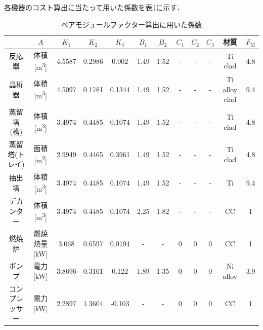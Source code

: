 \documentclass[a4j]{jsreport}
\begin{document}
各機器のコスト算出に当たって用いた係数を表\ref{BM係数}に示す．
\begin{table}[htbp]
    \caption{ベアモジュールファクター算出に用いた係数}
    \label{BM係数}
    \begin{tabular}{cccccccccccc}\hline
    &$A$ & $K_1$     & $K_2$     & $K_3$     & $B_1$   & $B_2$   &$C_1$&$C_2$&$C_3$& 材質 & $F_\mathrm{M}$  \\\hline
    反応器  & 体積[\si{\cubic\metre}]  & 4.5587 & 0.2986 & 0.002  & 1.49 & 1.52 &-&-&-& Ti clad       & 4.8 \\
    晶析器   & 体積[\si{\cubic\metre}] & 4.5097 & 0.1781 & 0.1344 & 1.49 & 1.52 &-&-&-& Ti alloy clad & 9.4 \\
    蒸留塔(槽)&  体積[\si{\cubic\metre}]   & 3.4974 & 0.4485 & 0.1074 & 1.49 & 1.52 &-&-&-& Ti clad    & 4.8 \\
    蒸留塔(トレイ)& 面積[\si{\square\metre}] & 2.9949 & 0.4465 & 0.3961 & 1.49 & 1.52 &-&-&-& Ti clad   & 4.8 \\
    抽出塔   & 体積[\si{\cubic\metre}] & 3.4974 & 0.4485 & 0.1074 & 1.49 & 1.52 &-&-&-& Ti            & 9.4 \\
    デカンター&  体積[\si{\cubic\metre}] & 3.4974 & 0.4485 & 0.1074 & 2.25 & 1.82 &-&-&-& CC            & 1   \\
    燃焼炉   & 燃焼熱量[\si{\kilo \watt}] & 3.068  & 0.6597 & 0.0194 & -    & -    &0&0&0& CC             & 1   \\
    ポンプ   & 電力[\si{\kilo\watt}] & 3.8696 & 0.3161 & 0.122  & 1.89 & 1.35 &0&0&0& Ni alloy      & 3.9 \\
    コンプレッサー& 電力[\si{\kilo\watt}] & 2.2897 & 1.3604 & -0.103 & -    & -    &0&0&0& CC            & 1  \\\hline
    \end{tabular}
\end{table}
\end{document}
